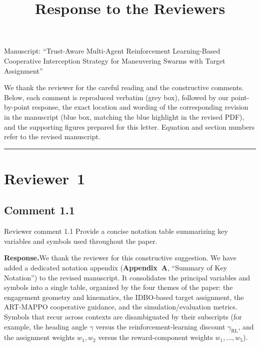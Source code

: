 \documentclass[11pt]{article}
\title{\vspace{-1.5em}Response to the Reviewers}
\date{}
\newcommand{\rsp}{\medskip\noindent\textbf{Response.}\quad}
\begin{document}
\maketitle
\vspace{-3em}
\begin{center}\small
Manuscript: ``Trust-Aware Multi-Agent Reinforcement Learning-Based Cooperative
Interception Strategy for Maneuvering Swarms with Target Assignment''
\end{center}
\bigskip

\noindent We thank the reviewer for the careful reading and the constructive
comments. Below, each comment is reproduced verbatim (grey box), followed by our
point-by-point response, the exact location and wording of the corresponding
revision in the manuscript (blue box, matching the blue highlight in the revised
PDF), and the supporting figures prepared for this letter. Equation and section
numbers refer to the revised manuscript.

\bigskip
\hrule
\bigskip

\section*{Reviewer~1}


\subsection*{Comment 1.1}

\begin{reviewercomment}{Reviewer comment 1.1}
Provide a concise notation table summarizing key variables and symbols used
throughout the paper.
\end{reviewercomment}

\rsp We thank the reviewer for this constructive suggestion. We have added a
dedicated notation appendix (\textbf{Appendix~A}, ``Summary of Key Notation'') to
the revised manuscript. It consolidates the principal variables and symbols into a
single table, organized by the four themes of the paper: the engagement geometry
and kinematics, the IDBO-based target assignment, the ART-MAPPO cooperative
guidance, and the simulation/evaluation metrics. Symbols that recur across
contexts are disambiguated by their subscripts (for example, the heading angle
$\gamma$ versus the reinforcement-learning discount $\gamma_{\mathrm{RL}}$, and the
assignment weights $w_1,w_2$ versus the reward-component weights $w_1,\dots,w_5$).
\end{document}
